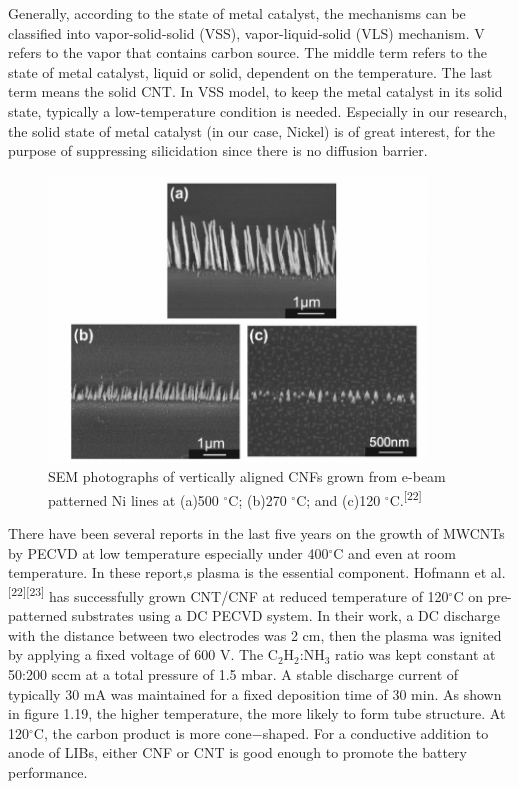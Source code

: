 Generally, according to the state of metal catalyst, the mechanisms can be classified into vapor-solid-solid (VSS), vapor-liquid-solid (VLS) mechanism. V refers to the vapor that contains carbon source.  The middle term  refers to the state of metal catalyst, liquid or solid, dependent on the temperature.  The last term means the solid CNT. In VSS model, to keep the metal catalyst in its solid state, typically a low-temperature condition is needed. Especially in our research,  the solid state of metal catalyst (in our case, Nickel) is of great interest, for the purpose of suppressing silicidation since there is no diffusion barrier. 
\begin{figure}[H]
\centering
\includegraphics[width=10cm]{src/fig/fig19.png}
\caption{SEM photographs of vertically aligned CNFs grown from e-beam patterned Ni lines at (a)500 \(^\circ\)C; (b)270 \(^\circ\)C; and (c)120 \(^\circ\)C.\textsuperscript{[22]}}
\end{figure}
There have been several reports in the last ﬁve years on the growth of MWCNTs by PECVD at low temperature especially under 400\(^\circ\)C and even at room temperature. In these report,s plasma is the essential component.
Hofmann et al.\textsuperscript{[22]}\textsuperscript{[23]} has  successfully grown CNT/CNF at reduced temperature of 120\(^\circ\)C on pre-patterned substrates using a DC PECVD system.  In their work, a DC discharge with the distance between two electrodes was 2 cm, then the plasma was ignited by applying a ﬁxed voltage of 600 V. The $\mathrm{C_{2}H_{2}}$:$\mathrm{NH_{3}}$ ratio was kept constant at 50:200 sccm at a total pressure of 1.5 mbar. A stable discharge current of typically 30 mA was maintained for a ﬁxed deposition time of 30 min.
As shown in figure 1.19,  the higher temperature, the more likely to form tube structure. At 120\(^\circ\)C, the carbon product is more cone$-$shaped. For a conductive addition to anode of LIBs, either CNF or CNT is good enough to promote the battery performance. 
\newpage
